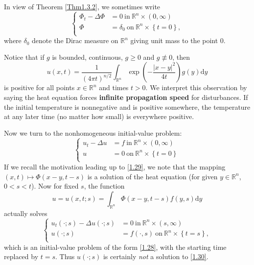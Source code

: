 In view of Theorem \ref{Thm1.3.2}, we sometimes write 
$$
\left\{ \begin{aligned}
	\Phi _t-\Delta \Phi &=0\ \text{in}\ \mathbb{R} ^n\times \left( 0,\infty \right)\\
	\Phi &=\delta _0\ \text{on}\ \mathbb{R} ^n\times \left\{ t=0 \right\},\\
\end{aligned} \right. 
$$
where $\delta_0$ denote the Dirac measure on $\mathbb{R}^n$ giving unit mass to the point $0$.\par
Notice that if $g$ is bounded, continuous, $g\ge 0$ and $g\not\equiv 0$, then 
$$
u\left( x,t \right) =\frac{1}{\left( 4\pi t \right) ^{n/2}}\int_{\mathbb{R} ^n}{\exp \left( -\frac{\left| x-y \right|^2}{4t} \right) g\left( y \right) \mathrm{d}y}
$$
is positive for all points $x\in\mathbb{R}^n$ and times $t>0$. We interpret this observation by saying the heat equation forces \textbf{infinite propagation speed} for disturbances. If the initial temperature is nonnegative and is positive somewhere, the temperature at any later time (no matter how small) is everywhere positive.\par
Now we turn to the nonhomogeneous initial-value problem: 
\begin{equation}\label{1.30}
\left\{ \begin{aligned}
	u_t-\Delta u&=f\ \text{in}\ \mathbb{R} ^n\times \left( 0,\infty \right)\\
	u&=0\ \text{on}\ \mathbb{R} ^n\times \left\{ t=0 \right\}\\
\end{aligned} \right. 
\end{equation}
If we recall the motivation leading up to \eqref{1.29}, we note that the mapping $(x,t)\mapsto\Phi(x-y,t-s)$ is a solution of the heat equation (for given $y\in\mathbb{R}^n$, $0<s<t$). Now for fixed $s$, the function 
$$
u=u\left( x,t;s \right) =\int_{\mathbb{R} ^n}{\Phi \left( x-y,t-s \right) f\left( y,s \right) \mathrm{d}y}
$$
actually solves 
\begin{equation}\label{1.31}
\left\{ \begin{aligned}
	u_t(\cdot;s)-\Delta u(\cdot;s)&=0\ \text{in}\ \mathbb{R} ^n\times \left( s,\infty \right)\\
	u(\cdot;s)&=f(\cdot,s)\ \text{on}\ \mathbb{R} ^n\times \left\{ t=s \right\},\\
\end{aligned} \right. 
\end{equation}
which is an initial-value problem of the form \eqref{1.28}, with the starting time replaced by $t=s$. Thus $u(\cdot;s)$ is certainly \textit{not} a solution to \eqref{1.30}.\par
